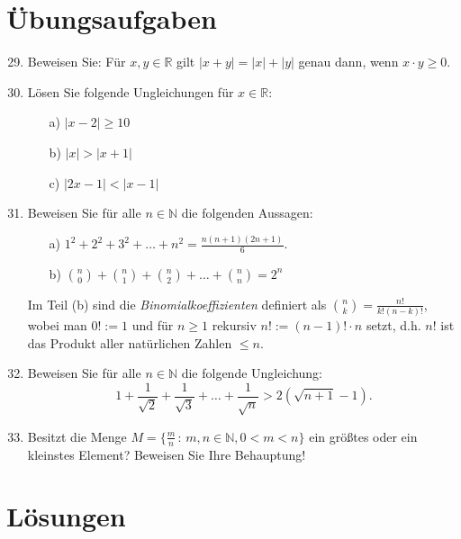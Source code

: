 \documentclass[12pt,a4paper,leqno]{article}
\author{Martin Dreher}
\begin{document}
\section{Übungsaufgaben}


\begin{enumerate}
\setcounter{enumi}{28}
\item	Beweisen Sie: Für $x,y\in \mathbb{R}$ gilt $|x+y|= |x|+|y|$ genau dann, wenn $x\cdot y \ge 0$.
\item	Lösen Sie folgende Ungleichungen für $x\in \mathbb{R}$:
		\begin{enumerate}
			\item[a)] $|x-2| \ge 10$
			\item[b)] $|x| > |x+1|$
			\item[c)] $|2x-1|<|x-1|$
		\end{enumerate}
\item	Beweisen Sie für alle $n \in \mathbb{N}$ die folgenden Aussagen:
		\begin{enumerate}
			\item[a)] $1^2 + 2^2 + 3^2 + \dots + n^2 = \frac {n (n+1)(2n+1)} 6$.
			\item[b)] ${n \choose 0} + {n \choose 1} + {n \choose 2} + \dots + {n \choose n} = 2^n$
		\end{enumerate}
	Im Teil (b) sind die {\em Binomialkoeffizienten} definiert als ${n \choose k} = \frac {n! }{k! (n-k)! }$, wobei man $0! :=1$ und für $n \ge 1$ rekursiv $n! :=(n-1)! \cdot n$ setzt, d.h. $n! $ ist das Produkt aller natürlichen Zahlen $\le n$.
\item	Beweisen Sie für alle $n \in \mathbb{N}$ die folgende Ungleichung:
	$$
	1 + \frac 1 {\sqrt{2}} + \frac 1 {\sqrt{3}} + \dots + \frac 1 {\sqrt{n}} > 2\left(\sqrt{n+1}-1\right).
	$$
\item	Besitzt die Menge $M= \{ \frac m n \,: \, m,n \in \mathbb{N}, 0<m<n \}$ ein größtes oder ein kleinstes Element? Beweisen Sie Ihre Behauptung!
\end{enumerate}

\section{Lösungen}
\end{document}
